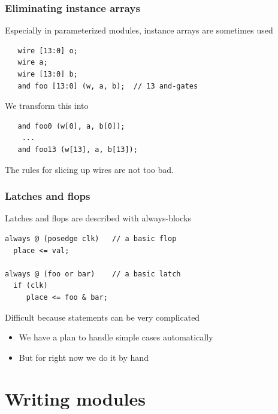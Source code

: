 \documentclass[mathserif]{beamer}
\begin{document}
\begin{frame}[fragile]
\frametitle{Eliminating instance arrays}

Especially in parameterized modules, instance arrays are sometimes used

\begin{verbatim}
   wire [13:0] o;
   wire a;
   wire [13:0] b;
   and foo [13:0] (w, a, b);  // 13 and-gates
\end{verbatim}

We transform this into 
\begin{verbatim}
   and foo0 (w[0], a, b[0]);
    ...
   and foo13 (w[13], a, b[13]);
\end{verbatim}

The rules for slicing up wires are not too bad.

\end{frame}

\begin{frame}[fragile]
\frametitle{Latches and flops}

\bigskip
Latches and flops are described with always-blocks

\begin{verbatim}
always @ (posedge clk)   // a basic flop
  place <= val;

always @ (foo or bar)    // a basic latch
  if (clk)
     place <= foo & bar;
\end{verbatim}

\bigskip
Difficult because statements can be very complicated
\begin{itemize}
\item We have a plan to handle simple cases automatically
\item But for right now we do it by hand
\end{itemize}

\end{frame}


\section{Writing modules}
\end{document}
